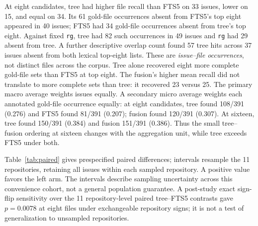 \documentclass[
]{article}
\begin{document}
At eight candidates, tree had higher file recall than FTS5 on 33 issues,
lower on 15, and equal on 34. Its 61 gold-file occurrences absent from
FTS5's top eight appeared in 40 issues; FTS5 had 34 gold-file
occurrences absent from tree's top eight. Against fixed \texttt{rg},
tree had 82 such occurrences in 49 issues and \texttt{rg} had 29 absent
from tree. A further descriptive overlap count found 57 tree hits across
37 issues absent from both lexical top-eight lists. These are
\emph{issue--file occurrences}, not distinct files
across the corpus. Tree alone recovered eight more complete gold-file
sets than FTS5 at top eight. The fusion's higher mean recall did not
translate to more complete sets than tree: it recovered 23 versus 25.
The primary macro average weights issues equally. A secondary micro
average weights each annotated gold-file occurrence equally: at eight
candidates, tree found 108/391 (0.276) and FTS5 found 81/391 (0.207);
fusion found 120/391 (0.307). At sixteen, tree found 150/391 (0.384)
and fusion 151/391 (0.386). Thus the small tree--fusion ordering at
sixteen changes with the aggregation unit, while tree exceeds FTS5
under both.

Table~\ref{tab:paired} gives prespecified paired differences; intervals resample
the 11 repositories, retaining all issues within each sampled repository.
A positive value favors
the left arm. The intervals describe sampling uncertainty across this
convenience cohort, not a general population guarantee.
A post-study exact sign-flip sensitivity over the 11 repository-level
paired tree--FTS5 contrasts gave $p=0.0078$ at eight files under
exchangeable repository signs; it is not a test of generalization to
unsampled repositories.
\end{document}
